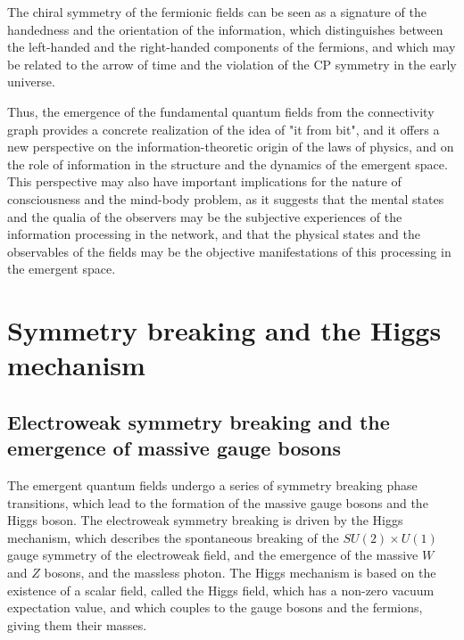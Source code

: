 \begin{tcolorbox}[colback=green!5!white,colframe=green!75!black,title=Question]
    The chiral symmetry of the fermionic fields can be seen as a signature of the handedness and the orientation of the information, which distinguishes between the left-handed and the right-handed components of the fermions, and which may be related to the arrow of time and the violation of the CP symmetry in the early universe.

    Thus, the emergence of the fundamental quantum fields from the connectivity graph provides a concrete realization of the idea of "it from bit", and it offers a new perspective on the information-theoretic origin of the laws of physics, and on the role of information in the structure and the dynamics of the emergent space. This perspective may also have important implications for the nature of consciousness and the mind-body problem, as it suggests that the mental states and the qualia of the observers may be the subjective experiences of the information processing in the network, and that the physical states and the observables of the fields may be the objective manifestations of this processing in the emergent space.
\end{tcolorbox}

\section{Symmetry breaking and the Higgs mechanism}
\subsection{Electroweak symmetry breaking and the emergence of massive gauge bosons}
The emergent quantum fields undergo a series of symmetry breaking phase transitions, which lead to the formation of the massive gauge bosons and the Higgs boson. The electroweak symmetry breaking is driven by the Higgs mechanism, which describes the spontaneous breaking of the $SU(2) \times U(1)$ gauge symmetry of the electroweak field, and the emergence of the massive $W$ and $Z$ bosons, and the massless photon. The Higgs mechanism is based on the existence of a scalar field, called the Higgs field, which has a non-zero vacuum expectation value, and which couples to the gauge bosons and the fermions, giving them their masses.

